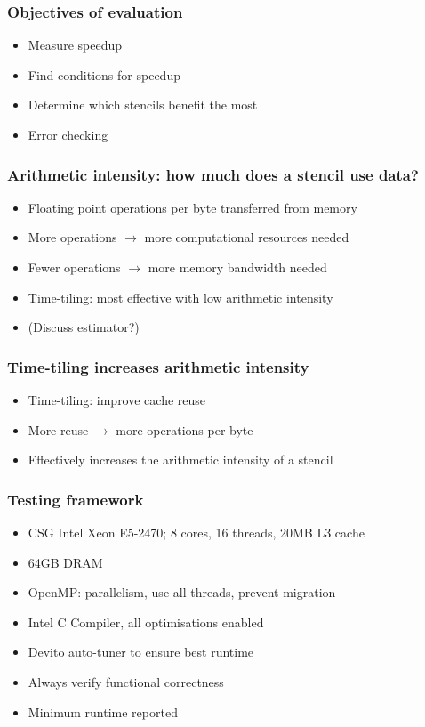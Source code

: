 \documentclass{beamer}
\begin{document}
\begin{frame}
\frametitle{Objectives of evaluation}

\begin{itemize}
	\item Measure speedup
	\item Find conditions for speedup
	\item Determine which stencils benefit the most
	\item Error checking
\end{itemize}
\end{frame}



\begin{frame}
\frametitle{Arithmetic intensity: how much does a stencil use data?}

\begin{itemize}
	\item Floating point operations per byte transferred from memory
	\item More operations \(\rightarrow\) more computational resources needed
	\item Fewer operations \(\rightarrow\) more memory bandwidth needed
	\item Time-tiling: most effective with low arithmetic intensity
	\item (Discuss estimator?)
\end{itemize}
\end{frame}



\begin{frame}
\frametitle{Time-tiling increases arithmetic intensity}

\begin{itemize}
	\item Time-tiling: improve cache reuse
	\item More reuse \(\rightarrow\) more operations per byte
	\item Effectively increases the arithmetic intensity of a stencil
\end{itemize}
\end{frame}



\begin{frame}
\frametitle{Testing framework}

\begin{itemize}
	\item CSG Intel Xeon E5-2470; 8 cores, 16 threads, 20MB L3 cache
	\item 64GB DRAM
	\item OpenMP: parallelism, use all threads, prevent migration
	\item Intel C Compiler, all optimisations enabled
	\item Devito auto-tuner to ensure best runtime
	\item Always verify functional correctness
	\item Minimum runtime reported
\end{itemize}
\end{frame}
\end{document}
